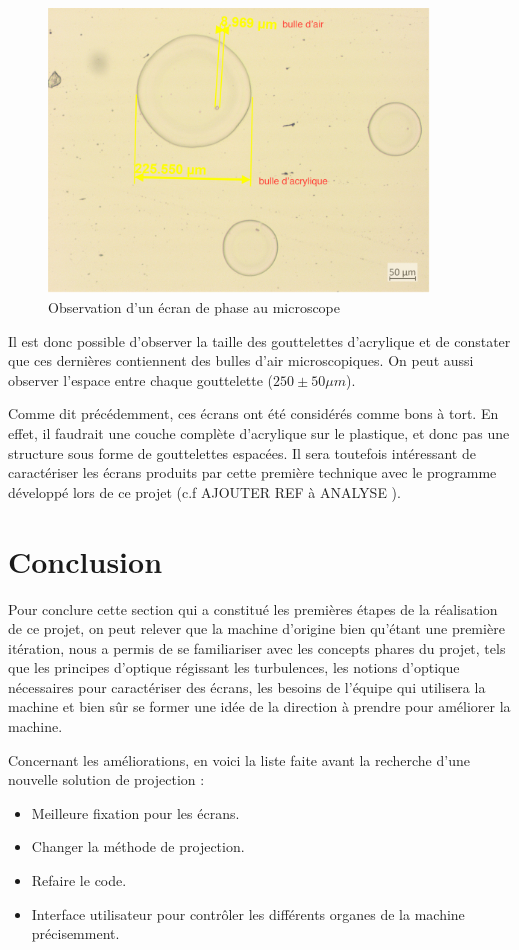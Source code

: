 \begin{figure}[H]
    \centering
    \includegraphics[width = 0.9\textwidth]{assets/figures/situation_initiale/observation_microscope.png}
    \caption{Observation d'un écran de phase au microscope}\label{fig:ecran_phase_beta_microscope}
\end{figure}
Il est donc possible d'observer la taille des gouttelettes d'acrylique et de constater que ces dernières contiennent des bulles d'air microscopiques.
On peut aussi observer l'espace entre chaque gouttelette ($250\pm 50 \mu m$).

Comme dit précédemment, ces écrans ont été considérés comme bons à tort. En effet, il faudrait une couche complète d'acrylique sur le plastique, et donc pas une structure sous forme de gouttelettes espacées.
Il sera toutefois intéressant de caractériser les écrans produits par cette première technique avec le programme développé lors de ce projet (c.f \color{red} AJOUTER REF à ANALYSE \color{black}).

\section{Conclusion}
Pour conclure cette section qui a constitué les premières étapes de la réalisation de ce projet, on peut relever que la machine d'origine bien qu'étant une première itération, nous a permis de se familiariser avec les concepts phares du projet, tels que
les principes d'optique régissant les turbulences, les notions d'optique nécessaires pour caractériser des écrans, les besoins de l'équipe qui utilisera la machine et bien sûr se former une idée de la direction à prendre pour améliorer la machine.

Concernant les améliorations, en voici la liste faite avant la recherche d'une nouvelle solution de projection :
\begin{itemize}
    \item Meilleure fixation pour les écrans.
    \item Changer la méthode de projection.
    \item Refaire le code.
    \item Interface utilisateur pour contrôler les différents organes de la machine précisemment.
\end{itemize}